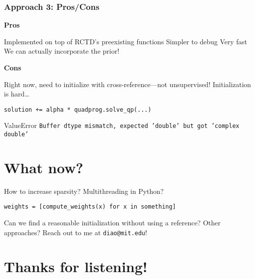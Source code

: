 \documentclass{beamer}
\begin{document}
\begin{frame}[fragile]
    \frametitle{Approach 3: Pros/Cons}
    \begin{itemize}
        \ii
        \textbf{Pros}
        \begin{itemize}
            \ii Implemented on top of RCTD's preexisting functions
            \ii Simpler to debug
            \ii Very fast
            \ii We can actually incorporate the prior!
        \end{itemize}
        \ii \textbf{Cons}
        \begin{itemize}

            \ii Right now, need to initialize with cross-reference---not unsupervised!
            \ii
            Initialization is hard\ldots
        \end{itemize}
    \end{itemize}
\begin{verbatim}
solution += alpha * quadprog.solve_qp(...)
\end{verbatim}

            \begin{alertblock}{ValueError}
                \footnotesize
                \texttt{Buffer dtype mismatch, expected 'double' but got 'complex double'}
            \end{alertblock}
\end{frame}


\section{What now?}

\begin{frame}[fragile]
    \begin{itemize}
        \ii How to 
        \alert{increase sparsity}?
        \ii Multithreading in Python?

\begin{verbatim}
weights = [compute_weights(x) for x in something]
\end{verbatim}
        \ii
        Can we find a reasonable initialization without using a reference?
        \ii
        Other approaches?
        \ii
        Reach out to me at \texttt{diao@mit.edu}!
    \end{itemize}
\end{frame}

\section{Thanks for listening!}
\end{document}
